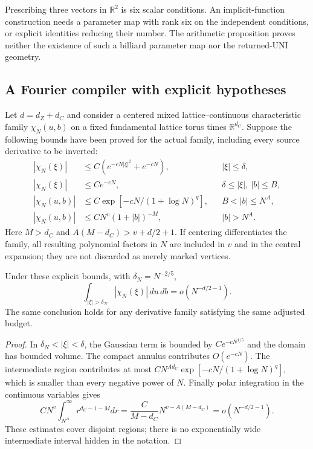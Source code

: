 Prescribing three vectors in $\mathbb R^2$ is six scalar conditions. An implicit-function construction needs a parameter map with rank six on the independent conditions, or explicit identities reducing their number. The arithmetic proposition proves neither the existence of such a billiard parameter map nor the returned-UNI geometry.

\subsection{A Fourier compiler with explicit hypotheses}
Let $d=d_Z+d_C$ and consider a centered mixed lattice--continuous characteristic family $\chi_N(u,b)$ on a fixed fundamental lattice torus times $\mathbb R^{d_C}$. Suppose the following bounds have been proved for the actual family, including every source derivative to be inverted:
\begin{align*}
 |\chi_N(\xi)|&\le C(e^{-cN|\xi|^2}+e^{-cN}), &&|\xi|\le\delta,\\
 |\chi_N(\xi)|&\le Ce^{-cN}, &&\delta\le|\xi|,\ |b|\le B,\\
 |\chi_N(u,b)|&\le C\exp[-cN/(1+\log N)^q],&&B<|b|\le N^A,\\
 |\chi_N(u,b)|&\le CN^v(1+|b|)^{-M},&&|b|>N^A.
\end{align*}
Here $M>d_C$ and $A(M-d_C)>v+d/2+1$. If centering differentiates the family, all resulting polynomial factors in $N$ are included in $v$ and in the central expansion; they are not discarded as merely marked vertices.

\begin{theorem}
\label{thm:r33-a2-integral}
Under these explicit bounds, with $\delta_N=N^{-2/5}$,
\[
 \int_{|\xi|>\delta_N}|\chi_N(\xi)|\,du\,db
     =o(N^{-d/2-1}).
\]
The same conclusion holds for any derivative family satisfying the same adjusted budget.
\end{theorem}

\begin{proof}
In $\delta_N<|\xi|<\delta$, the Gaussian term is bounded by $Ce^{-cN^{1/5}}$ and the domain has bounded volume. The compact annulus contributes $O(e^{-cN})$. The intermediate region contributes at most
$CN^{Ad_C}\exp[-cN/(1+\log N)^q]$, which is smaller than every negative power of $N$. Finally polar integration in the continuous variables gives
\[
 CN^v\int_{N^A}^\infty r^{d_C-1-M}dr
 =\frac{C}{M-d_C}N^{v-A(M-d_C)}=o(N^{-d/2-1}).
\]
These estimates cover disjoint regions; there is no exponentially wide intermediate interval hidden in the notation.
\end{proof}


